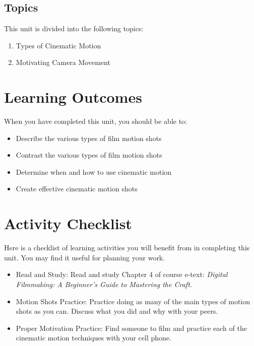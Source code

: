 \documentclass[
]{book}
\providecommand{\tightlist}{%
  \setlength{\itemsep}{0pt}\setlength{\parskip}{0pt}}
\begin{document}
\hypertarget{topics-3}{%
\subsection*{Topics}\label{topics-3}}

This unit is divided into the following topics:

\begin{enumerate}
\def\labelenumi{\arabic{enumi}.}
\tightlist
\item
  Types of Cinematic Motion\\
\item
  Motivating Camera Movement
\end{enumerate}

\hypertarget{learning-outcomes-3}{%
\section*{Learning Outcomes}\label{learning-outcomes-3}}

When you have completed this unit, you should be able to:

\begin{itemize}
\tightlist
\item
  Describe the various types of film motion shots
\item
  Contrast the various types of film motion shots
\item
  Determine when and how to use cinematic motion
\item
  Create effective cinematic motion shots
\end{itemize}

\hypertarget{activity-checklist-3}{%
\section*{Activity Checklist}\label{activity-checklist-3}}

\begin{reflect}
Here is a checklist of learning activities you will benefit from in completing this unit. You may find it useful for planning your work.

\begin{itemize}
\tightlist
\item
  Read and Study: Read and study Chapter 4 of course e-text: \emph{Digital Filmmaking: A Beginner's Guide to Mastering the Craft.}
\item
  Motion Shots Practice: Practice doing as many of the main types of motion shots as you can. Discuss what you did and why with your peers.
\item
  Proper Motivation Practice: Find someone to film and practice each of the cinematic motion techniques with your cell phone.
\end{itemize}
\end{reflect}
\end{document}
